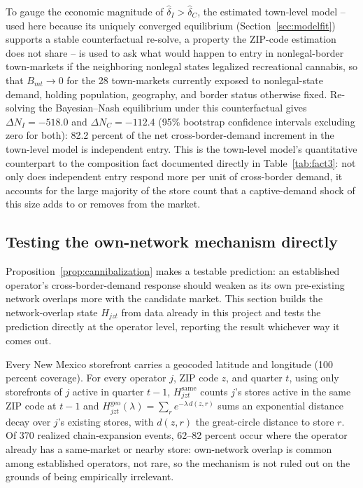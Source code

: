 \documentclass[english,12pt]{article}
\begin{document}
To gauge the economic magnitude of $\hat\delta_I>\hat\delta_C$, the estimated town-level model -- used here because its uniquely converged equilibrium (Section~\ref{sec:modelfit}) supports a stable counterfactual re-solve, a property the ZIP-code estimation does not share -- is used to ask what would happen to entry in nonlegal-border town-markets if the neighboring nonlegal states legalized recreational cannabis, so that $B_{mt}\to0$ for the 28 town-markets currently exposed to nonlegal-state demand, holding population, geography, and border status otherwise fixed. Re-solving the Bayesian--Nash equilibrium under this counterfactual gives $\Delta N_I = -518.0$ and $\Delta N_C = -112.4$ (95\% bootstrap confidence intervals excluding zero for both): 82.2 percent of the net cross-border-demand increment in the town-level model is independent entry. This is the town-level model's quantitative counterpart to the composition fact documented directly in Table~\ref{tab:fact3}: not only does independent entry respond more per unit of cross-border demand, it accounts for the large majority of the store count that a captive-demand shock of this size adds to or removes from the market.

\subsection{Testing the own-network mechanism directly}
\label{sec:mechreg}

Proposition~\ref{prop:cannibalization} makes a testable prediction: an established operator's cross-border-demand response should weaken as its own pre-existing network overlaps more with the candidate market. This section builds the network-overlap state $H_{jzt}$ from data already in this project and tests the prediction directly at the operator level, reporting the result whichever way it comes out.

Every New Mexico storefront carries a geocoded latitude and longitude (100 percent coverage). For every operator $j$, ZIP code $z$, and quarter $t$, using only storefronts of $j$ active in quarter $t-1$, $H^{\text{same}}_{jzt}$ counts $j$'s stores active in the same ZIP code at $t-1$ and $H^{\text{geo}}_{jzt}(\lambda)=\sum_{r} e^{-\lambda\,d(z,r)}$ sums an exponential distance decay over $j$'s existing stores, with $d(z,r)$ the great-circle distance to store $r$. Of 370 realized chain-expansion events, 62--82 percent occur where the operator already has a same-market or nearby store: own-network overlap is common among established operators, not rare, so the mechanism is not ruled out on the grounds of being empirically irrelevant.
\end{document}
